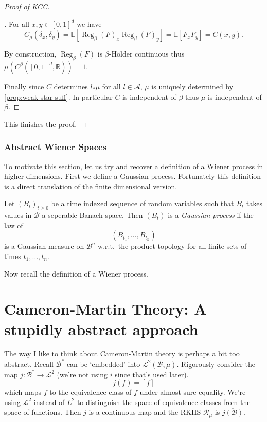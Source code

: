 \documentclass[fontsize=12pt, DIV=10]{scrreprt}
\theoremstyle{remark}
\newenvironment{subproof}[1][\proofname]{%
  \renewcommand{\qedsymbol}{$\blacksquare$}%
  \begin{proof}[#1]%
}{%
  \end{proof}%
}
\newcommand{\R}{\mathbb R}
\newcommand{\E}{\mathbb E}
\newcommand{\calA}{\mathcal A}
\newcommand{\calB}{\mathcal B}
\newcommand{\calL}{\mathcal L}
\newcommand{\calR}{\mathcal R}
\DeclareMathOperator{\reg}{Reg}
\newcommand{\unitbox}{\ensuremath{[0,1]^d}}
\begin{document}
\begin{proof}[Proof of KCC]
\begin{subproof}
		For all $x, y \in [0, 1]^d$ we have
		\begin{equation}
			C_{\mu}(\delta_x, \delta_y) = \E[\reg_{\beta}(F)_x \reg_{\beta}(F)_y]
			= \E[F_x F_y] = C(x, y).
		\end{equation}

		By construction, $\reg_{\beta}(F)$ is $\beta$-H\"older continuous thus $\mu(C^{\beta}(\unitbox, \R)) = 1$.

		Finally since $C$ determines $l_* \mu$ for all $l \in \calA$, $\mu$ is uniquely determined by \vref{prop:weak-star-suff}. In particular $C$ is independent of $\beta$ thus $\mu$ is independent of $\beta$.
	\end{subproof}

	This finishes the proof.
\end{proof}

\subsection{Abstract Wiener Spaces}

To motivate this section, let us try and recover a definition of a Wiener process in higher dimensions. First we define a Gaussian process. Fortunately this definition is a direct translation of the finite dimensional version.
\begin{defn}
	Let $(B_t)_{t \geq 0}$ be a time indexed sequence of random variables such that $B_t$ takes values in $\calB$ a seperable Banach space. Then $(B_t)$ is a \emph{Gaussian process} if the law of
	\begin{equation}
		(B_{t_1}, \ldots, B_{t_n})
	\end{equation}
	is a Gaussian measure on $\calB^n$ w.r.t.\ the product topology for all finite sets of times $t_1, \ldots, t_n$.
\end{defn}
Now recall the definition of a Wiener process.

\appendix

\chapter{Cameron-Martin Theory: A stupidly abstract approach}

The way I like to think about Cameron-Martin theory is perhaps a bit too abstract. Recall $\calB^*$ can be `embedded' into $\calL^2(\calB, \mu)$. Rigorously consider the map $j: \calB^* \to \calL^2$ (we're not using $i$ since that's used later).
\begin{equation}
	j(f) = [f]
\end{equation}
which maps $f$ to the equivalence class of $f$ under almost sure equality. We're using $\calL^2$ instead of $L^2$ to distinguish the space of equivalence classes from the space of functions. Then $j$ is a continuous map and the RKHS $\calR_{\mu}$ is $\overline{j(\calB)}$. 
\end{document}
